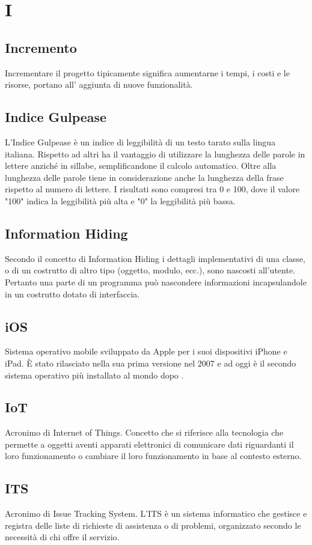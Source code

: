 \section*{I}
\markright{}
\subsection*{Incremento}
Incrementare il progetto tipicamente significa aumentarne i tempi, i costi e le risorse, portano all' aggiunta di nuove funzionalità.

\subsection*{Indice Gulpease}
L'Indice Gulpease è un indice di leggibilità di un testo tarato sulla lingua italiana. Rispetto ad altri ha il vantaggio di utilizzare la lunghezza delle parole in lettere anziché in sillabe, semplificandone il calcolo automatico. Oltre alla lunghezza delle parole tiene in considerazione anche la lunghezza della frase rispetto al numero di lettere. I risultati sono compresi tra 0 e 100, dove il valore "100" indica la leggibilità più alta e "0" la leggibilità più bassa.

\subsection*{Information Hiding}
Secondo il concetto di Information Hiding i dettagli implementativi di una classe, o di un costrutto di altro tipo (oggetto, modulo, ecc.), sono nascosti all'utente. Pertanto una parte di un programma può nascondere informazioni incapsulandole in un costrutto dotato di interfaccia.

\subsection*{iOS}
Sistema operativo mobile sviluppato da Apple per i suoi dispositivi iPhone e iPad. È stato rilasciato nella sua prima versione nel 2007 e ad oggi è il secondo sistema operativo più installato al mondo dopo .

\subsection*{IoT}
Acronimo di Internet of Things. Concetto che si riferisce alla tecnologia che permette a oggetti aventi apparati elettronici di comunicare dati riguardanti il loro funzionamento o cambiare il loro funzionamento in base al contesto esterno. 

\subsection*{ITS}
Acronimo di Issue Tracking System. L'ITS è un sistema informatico che gestisce e registra delle liste di richieste di assistenza o di problemi, organizzato secondo le necessità di chi offre il servizio.